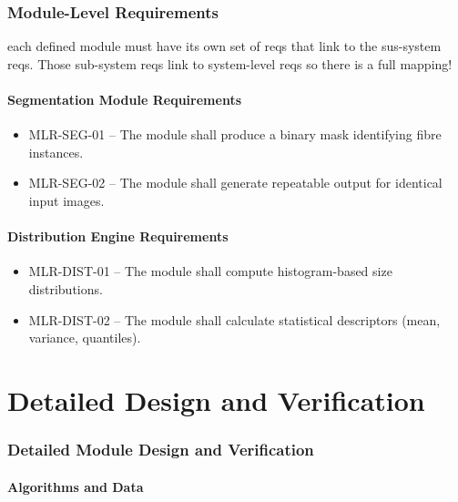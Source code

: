 \documentclass[11pt,a4paper]{article}
\begin{document}
\section{Module-Level Requirements}

each defined module must have its own set of reqs that link to the sus-system reqs.
Those sub-system reqs link to system-level reqs so there is a full mapping!

\subsection{Segmentation Module Requirements}

\begin{itemize}
    \item MLR-SEG-01 – The module shall produce a binary mask identifying fibre instances.
    \item MLR-SEG-02 – The module shall generate repeatable output for identical input images.
\end{itemize}

\subsection{Distribution Engine Requirements}

\begin{itemize}
    \item MLR-DIST-01 – The module shall compute histogram-based size distributions.
    \item MLR-DIST-02 – The module shall calculate statistical descriptors (mean, variance, quantiles).
\end{itemize}



\part{Detailed Design and Verification}

\section{Detailed Module Design and Verification}

\subsection{Algorithms and Data}
\end{document}
